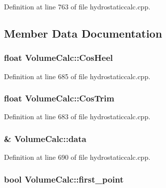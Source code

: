 Definition at line 763 of file hydrostaticcalc.\+cpp.



\subsection{Member Data Documentation}
\subsubsection[{\texorpdfstring{Cos\+Heel}{CosHeel}}]{\setlength{\rightskip}{0pt plus 5cm}float Volume\+Calc\+::\+Cos\+Heel}\hypertarget{structVolumeCalc_a5f92422c5175c94b265581fd19f1da24}{}\label{structVolumeCalc_a5f92422c5175c94b265581fd19f1da24}


Definition at line 685 of file hydrostaticcalc.\+cpp.

\subsubsection[{\texorpdfstring{Cos\+Trim}{CosTrim}}]{\setlength{\rightskip}{0pt plus 5cm}float Volume\+Calc\+::\+Cos\+Trim}\hypertarget{structVolumeCalc_a6de823cbd9bb3aaedcb398a43b3187a5}{}\label{structVolumeCalc_a6de823cbd9bb3aaedcb398a43b3187a5}


Definition at line 683 of file hydrostaticcalc.\+cpp.

\subsubsection[{\texorpdfstring{data}{data}}]{\& Volume\+Calc\+::data}\hypertarget{structVolumeCalc_acb7ab639ec6e5c77daf116c6eb58693a}{}\label{structVolumeCalc_acb7ab639ec6e5c77daf116c6eb58693a}


Definition at line 690 of file hydrostaticcalc.\+cpp.

\subsubsection[{\texorpdfstring{first\+\_\+point}{first_point}}]{\setlength{\rightskip}{0pt plus 5cm}bool Volume\+Calc\+::first\+\_\+point}\hypertarget{structVolumeCalc_ab639da79639aeb33b3aaeb429283f8ca}{}\label{structVolumeCalc_ab639da79639aeb33b3aaeb429283f8ca}


